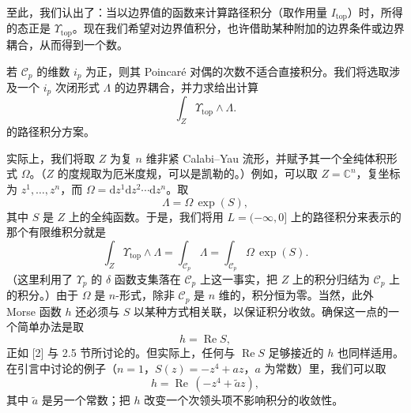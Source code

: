\documentclass[11pt,a4paper,UTF8]{ctexart}
\theoremstyle{plain}
\theoremstyle{definition}
\begin{document}
至此，我们认出了：当以边界值的函数来计算路径积分（取作用量 $I_{\mathrm{top}}$）时，所得的态正是 $\Upsilon_{\mathrm{top}}$。现在我们希望对边界值积分，也许借助某种附加的边界条件或边界耦合，从而得到一个数。

若 $\mathcal{C}_p$ 的维数 $i_p$ 为正，则其 Poincaré 对偶的次数不适合直接积分。我们将选取涉及一个 $i_p$ 次闭形式 $\Lambda$ 的边界耦合，并力求给出计算
\begin{equation}
    \int_Z \Upsilon_{\mathrm{top}}\wedge\Lambda.
    \tag{4.16}
\end{equation}
的路径积分方案。

实际上，我们将取 $Z$ 为复 $n$ 维非紧 Calabi--Yau 流形，并赋予其一个全纯体积形式 $\Omega$。（$Z$ 的度规取为厄米度规，可以是凯勒的。）例如，可以取 $Z=\mathbb{C}^n$，复坐标为 $z^1,\ldots,z^n$，而 $\Omega=\mathrm{d}z^1\mathrm{d}z^2\cdots\mathrm{d}z^n$。取
\begin{equation}
    \Lambda=\Omega\,\exp(S),
    \tag{4.17}
\end{equation}
其中 $S$ 是 $Z$ 上的全纯函数。于是，我们将用 $L=(-\infty,0]$ 上的路径积分来表示的那个有限维积分就是
\begin{equation}
    \int_Z \Upsilon_{\mathrm{top}}\wedge\Lambda
    =\int_{\mathcal{C}_p}\Lambda
    =\int_{\mathcal{C}_p}\Omega\,\exp(S).
    \tag{4.18}
\end{equation}
（这里利用了 $\Upsilon_p$ 的 $\delta$ 函数支集落在 $\mathcal{C}_p$ 上这一事实，把 $Z$ 上的积分归结为 $\mathcal{C}_p$ 上的积分。）由于 $\Omega$ 是 $n$-形式，除非 $\mathcal{C}_p$ 是 $n$ 维的，积分恒为零。当然，此外 Morse 函数 $h$ 还必须与 $S$ 以某种方式相关联，以保证积分收敛。确保这一点的一个简单办法是取
\begin{equation}
    h=\operatorname{Re}S,
    \tag{4.19}
\end{equation}
正如 [2] 与 2.5 节所讨论的。但实际上，任何与 $\operatorname{Re}S$ 足够接近的 $h$ 也同样适用。在引言中讨论的例子（$n=1$，$S(z)=-z^4+az$，$a$ 为常数）里，我们可以取
\begin{equation}
    h=\operatorname{Re}\,(-z^4+\tilde a z),
    \tag{4.20}
\end{equation}
其中 $\tilde a$ 是另一个常数；把 $h$ 改变一个次领头项不影响积分的收敛性。


\end{document}
